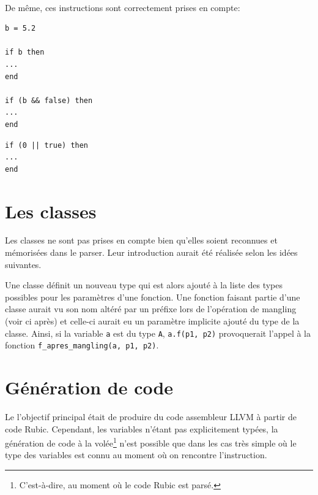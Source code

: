 \documentclass[12pt]{article}
\begin{document}
\paragraph{} De même, ces instructions sont correctement prises en compte:

\vspace{0.5cm}

\begin{minipage}{0.48\textwidth}
\begin{verbatim}
b = 5.2

if b then
...
end

if (b && false) then
...
end
\end{verbatim}
\end{minipage}
\begin{minipage}{0.48\textwidth}
\begin{verbatim}
if (0 || true) then
...
end
\end{verbatim}
\end{minipage}

\vspace{0.5cm}


\section{Les classes}

Les classes ne sont pas prises en compte bien qu'elles soient reconnues et mémorisées dans le parser. Leur introduction aurait été réalisée selon les idées suivantes.

Une classe définit un nouveau type qui est alors ajouté à la liste des types possibles pour les paramètres d'une fonction. Une fonction faisant partie d'une classe aurait vu son nom altéré par un préfixe lors de l'opération de mangling (voir ci après) et celle-ci aurait eu un paramètre implicite ajouté du type de la classe. Ainsi, si la variable \verb!a! est du type \verb!A!, \verb!a.f(p1, p2)! provoquerait l'appel à la fonction \verb!f_apres_mangling(a, p1, p2)!.

\section{Génération de code}

Le l'objectif principal était de produire du code assembleur LLVM à partir de code Rubic. Cependant, les variables n'étant pas explicitement typées, la génération de code à la volée\footnote{C'est-à-dire, au moment où le code Rubic est parsé.} n'est possible que dans les cas très simple où le type des variables est connu au moment où on rencontre l'instruction.
\end{document}
